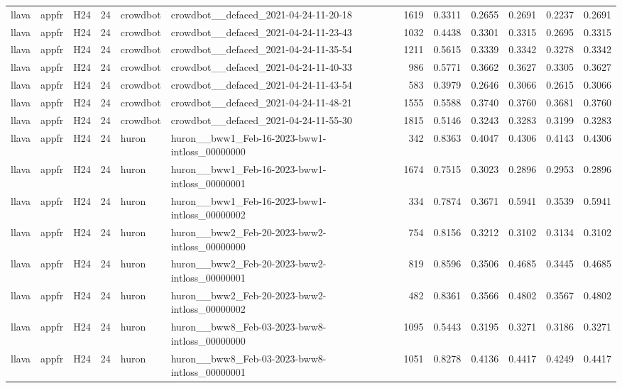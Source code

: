 \begin{table}[tbp]
\begin{tabular}{lllrllrrrrrr}
llava & appfr & H24 & 24 & crowdbot & crowdbot\_\_defaced\_2021-04-24-11-20-18 & 1619 & 0.3311 & 0.2655 & 0.2691 & 0.2237 & 0.2691 \\
llava & appfr & H24 & 24 & crowdbot & crowdbot\_\_defaced\_2021-04-24-11-23-43 & 1032 & 0.4438 & 0.3301 & 0.3315 & 0.2695 & 0.3315 \\
llava & appfr & H24 & 24 & crowdbot & crowdbot\_\_defaced\_2021-04-24-11-35-54 & 1211 & 0.5615 & 0.3339 & 0.3342 & 0.3278 & 0.3342 \\
llava & appfr & H24 & 24 & crowdbot & crowdbot\_\_defaced\_2021-04-24-11-40-33 & 986 & 0.5771 & 0.3662 & 0.3627 & 0.3305 & 0.3627 \\
llava & appfr & H24 & 24 & crowdbot & crowdbot\_\_defaced\_2021-04-24-11-43-54 & 583 & 0.3979 & 0.2646 & 0.3066 & 0.2615 & 0.3066 \\
llava & appfr & H24 & 24 & crowdbot & crowdbot\_\_defaced\_2021-04-24-11-48-21 & 1555 & 0.5588 & 0.3740 & 0.3760 & 0.3681 & 0.3760 \\
llava & appfr & H24 & 24 & crowdbot & crowdbot\_\_defaced\_2021-04-24-11-55-30 & 1815 & 0.5146 & 0.3243 & 0.3283 & 0.3199 & 0.3283 \\
llava & appfr & H24 & 24 & huron & huron\_\_bww1\_Feb-16-2023-bww1-intloss\_00000000 & 342 & 0.8363 & 0.4047 & 0.4306 & 0.4143 & 0.4306 \\
llava & appfr & H24 & 24 & huron & huron\_\_bww1\_Feb-16-2023-bww1-intloss\_00000001 & 1674 & 0.7515 & 0.3023 & 0.2896 & 0.2953 & 0.2896 \\
llava & appfr & H24 & 24 & huron & huron\_\_bww1\_Feb-16-2023-bww1-intloss\_00000002 & 334 & 0.7874 & 0.3671 & 0.5941 & 0.3539 & 0.5941 \\
llava & appfr & H24 & 24 & huron & huron\_\_bww2\_Feb-20-2023-bww2-intloss\_00000000 & 754 & 0.8156 & 0.3212 & 0.3102 & 0.3134 & 0.3102 \\
llava & appfr & H24 & 24 & huron & huron\_\_bww2\_Feb-20-2023-bww2-intloss\_00000001 & 819 & 0.8596 & 0.3506 & 0.4685 & 0.3445 & 0.4685 \\
llava & appfr & H24 & 24 & huron & huron\_\_bww2\_Feb-20-2023-bww2-intloss\_00000002 & 482 & 0.8361 & 0.3566 & 0.4802 & 0.3567 & 0.4802 \\
llava & appfr & H24 & 24 & huron & huron\_\_bww8\_Feb-03-2023-bww8-intloss\_00000000 & 1095 & 0.5443 & 0.3195 & 0.3271 & 0.3186 & 0.3271 \\
llava & appfr & H24 & 24 & huron & huron\_\_bww8\_Feb-03-2023-bww8-intloss\_00000001 & 1051 & 0.8278 & 0.4136 & 0.4417 & 0.4249 & 0.4417 \\

\end{tabular}
\end{table}
